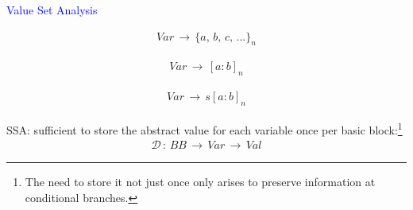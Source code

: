 \begin{frame}[fragile]{\textcolor{blue}{Value Set Analysis}}

\begin{minipage}{0.49\textwidth}

\underline{}
\begin{align*}
Var \,\rightarrow\,\{a,\,b,\,c,\,...\}_n
\end{align*}

\underline{}
\begin{align*}
Var \,\rightarrow\, [a:b]_n
\end{align*}

\underline{}
\begin{align*}
Var \,\rightarrow\,s[a:b]_n
\end{align*}
\end{minipage}

\vspace{1.5cm}

SSA: sufficient to store the {\color{blue}abstract value for each variable once per basic block}:\footnote{The need to store it not just once only arises to preserve information at conditional branches.}
\begin{align*}
\mathcal{D}\,:\, BB \,\rightarrow\, Var \, \rightarrow\, Val
\end{align*}

\end{frame}


